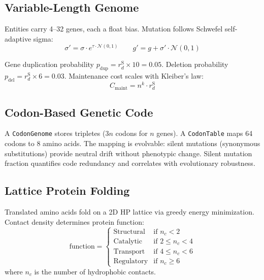 \documentclass[11pt,a4paper]{article}
\begin{document}
\subsection{Variable-Length Genome}

Entities carry 4--32 genes, each a float bias.
Mutation follows Schwefel self-adaptive sigma:
\begin{equation}
  \sigma' = \sigma \cdot e^{\tau \cdot \mathcal{N}(0,1)}
  \qquad
  g' = g + \sigma' \cdot \mathcal{N}(0,1)
\end{equation}

Gene duplication probability $p_{\text{dup}} = r_d^{\text{S}} \times 10 = 0.05$.
Deletion probability $p_{\text{del}} = r_d^{\text{S}} \times 6 = 0.03$.
Maintenance cost scales with Kleiber's law:
\begin{equation}
  C_{\text{maint}} = n^k \cdot r_d^{\text{S}}
\end{equation}

\subsection{Codon-Based Genetic Code}

A \texttt{CodonGenome} stores tripletes ($3n$ codons for $n$ genes).
A \texttt{CodonTable} maps 64 codons to 8 amino acids.
The mapping is evolvable: silent mutations (synonymous substitutions)
provide neutral drift without phenotypic change.
Silent mutation fraction quantifies code redundancy and
correlates with evolutionary robustness.

\subsection{Lattice Protein Folding}

Translated amino acids fold on a 2D HP lattice via
greedy energy minimization. Contact density determines
protein function:
\begin{equation}
  \text{function} = \begin{cases}
    \text{Structural} & \text{if } n_c < 2 \\
    \text{Catalytic}   & \text{if } 2 \leq n_c < 4 \\
    \text{Transport}   & \text{if } 4 \leq n_c < 6 \\
    \text{Regulatory}  & \text{if } n_c \geq 6
  \end{cases}
\end{equation}
where $n_c$ is the number of hydrophobic contacts.
\end{document}
